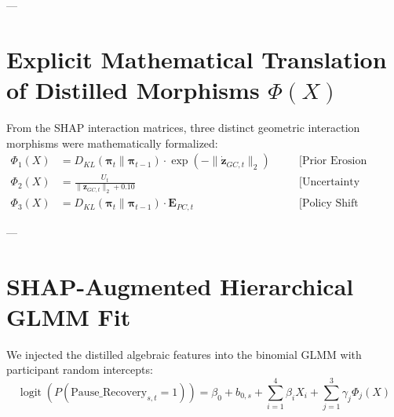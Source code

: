 \documentclass[11pt,twoside,a4paper]{article}
\begin{document}
---

\section{Explicit Mathematical Translation of Distilled Morphisms $\Phi(X)$}

From the SHAP interaction matrices, three distinct geometric interaction morphisms were mathematically formalized:
\begin{align}
\Phi_1(X) &= D_{KL}(\boldsymbol{\pi}_t \parallel \boldsymbol{\pi}_{t-1}) \cdot \exp\left( -\|\dot{\mathbf{z}}_{GC,t}\|_2 \right) \quad &&\text{[Prior Erosion under Vanishing Velocity]} \\
\Phi_2(X) &= \frac{U_t}{\|\mathbf{z}_{GC,t}\|_2 + 0.10} \quad &&\text{[Uncertainty Concentration per Unit Energy]} \\
\Phi_3(X) &= D_{KL}(\boldsymbol{\pi}_t \parallel \boldsymbol{\pi}_{t-1}) \cdot \mathbf{E}_{PC,t} \quad &&\text{[Policy Shift Coupled with Purkinje Memory Trace]}
\end{align}

---

\section{SHAP-Augmented Hierarchical GLMM Fit}

We injected the distilled algebraic features into the binomial GLMM with participant random intercepts:
\begin{equation}
\operatorname{logit}\left( P(\text{Pause\_Recovery}_{s,t} = 1) \right) = \beta_0 + b_{0,s} + \sum_{i=1}^4 \beta_i X_i + \sum_{j=1}^3 \gamma_j \Phi_j(X)
\end{equation}
\end{document}
